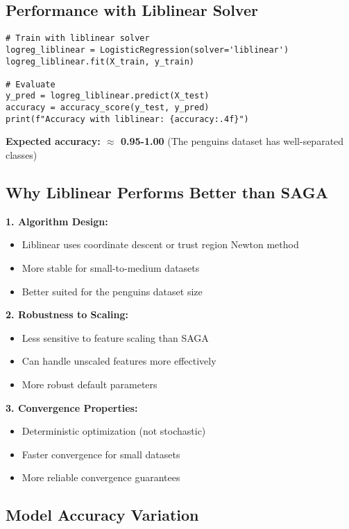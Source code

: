 \documentclass[12pt]{article}
\begin{document}
\subsection{Performance with Liblinear Solver}

\begin{lstlisting}[caption={Using liblinear solver}]
# Train with liblinear solver
logreg_liblinear = LogisticRegression(solver='liblinear')
logreg_liblinear.fit(X_train, y_train)

# Evaluate
y_pred = logreg_liblinear.predict(X_test)
accuracy = accuracy_score(y_test, y_pred)
print(f"Accuracy with liblinear: {accuracy:.4f}")
\end{lstlisting}

\textbf{Expected accuracy: $\approx$ 0.95-1.00} (The penguins dataset has well-separated classes)

\subsection{Why Liblinear Performs Better than SAGA}
\textbf{1. Algorithm Design:}
\begin{itemize}
    \item Liblinear uses coordinate descent or trust region Newton method
    \item More stable for small-to-medium datasets
    \item Better suited for the penguins dataset size
\end{itemize}
\textbf{2. Robustness to Scaling:}
\begin{itemize}
    \item Less sensitive to feature scaling than SAGA
    \item Can handle unscaled features more effectively
    \item More robust default parameters
\end{itemize}
\textbf{3. Convergence Properties:}
\begin{itemize}
    \item Deterministic optimization (not stochastic)
    \item Faster convergence for small datasets
    \item More reliable convergence guarantees
\end{itemize}


\subsection{Model Accuracy Variation}
\end{document}

